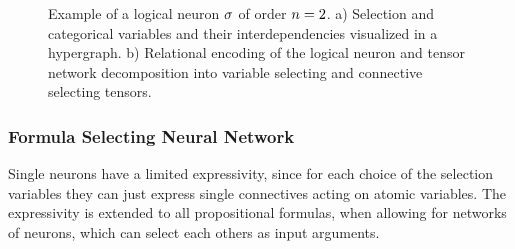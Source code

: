 \begin{figure}[h]
\begin{center}
	
\end{center}
\caption{Example of a logical neuron $\sigma$ of order $n=2$.
	a) Selection and categorical variables and their interdependencies visualized in a hypergraph.
	b) Relational encoding of the logical neuron and tensor network decomposition into variable selecting and connective selecting tensors.
}
\label{fig:neuronDecomposition}
\end{figure}


\subsubsection{Formula Selecting Neural Network}

Single neurons have a limited expressivity, since for each choice of the selection variables they can just express single connectives acting on atomic variables.
The expressivity is extended to all propositional formulas, when allowing for networks of neurons, which can select each others as input arguments.


